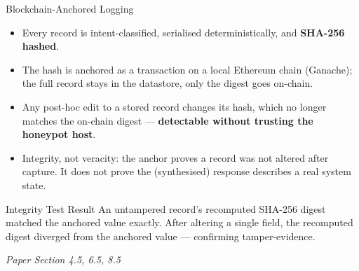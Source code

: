 \documentclass[aspectratio=169, 11pt]{beamer}
\newcommand{\srcnote}[1]{{\footnotesize\color{gray}\textit{#1}}}
\begin{document}
\begin{frame}{Blockchain-Anchored Logging}
    \begin{itemize}
        \item Every record is intent-classified, serialised deterministically, and \textbf{SHA-256 hashed}.
        \item The hash is anchored as a transaction on a local Ethereum chain (Ganache); the full record stays in the datastore, only the digest goes on-chain.
        \item Any post-hoc edit to a stored record changes its hash, which no longer matches the on-chain digest --- \textbf{detectable without trusting the honeypot host}.
        \item Integrity, not veracity: the anchor proves a record was not altered after capture. It does not prove the (synthesised) response describes a real system state.
    \end{itemize}
    \vspace{3mm}
    \begin{block}{\small Integrity Test Result}
        \small An untampered record's recomputed SHA-256 digest matched the anchored value exactly. After altering a single field, the recomputed digest diverged from the anchored value --- confirming tamper-evidence.
    \end{block}
    \srcnote{Paper Section 4.5, 6.5, 8.5}
\end{frame}

\end{document}
